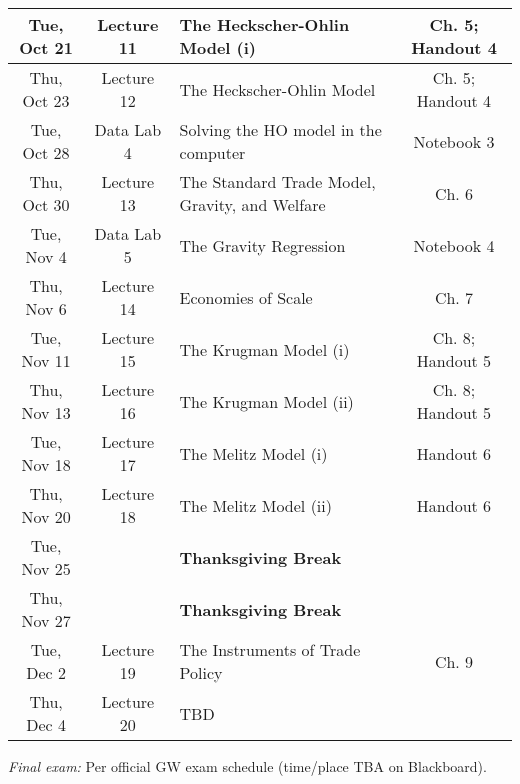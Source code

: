 \documentclass[11pt]{article}
\begin{document}
\begin{center}
\begin{tabular}{|c|c|l|c|}
        Tue,  Oct 21 &Lecture 11 & The Heckscher-Ohlin Model (i)  & Ch. 5; Handout 4  \\ \hline

        Thu, Oct 23 &  Lecture 12 & The Heckscher-Ohlin Model & Ch. 5; Handout 4  \\ \hline 

        Tue, Oct 28 &  Data Lab 4 & Solving the HO model in the computer & Notebook 3 \\ \hline

        Thu, Oct 30 & Lecture 13 & The Standard Trade Model, Gravity, and Welfare   &  Ch. 6   \\ \hline
        
        Tue, Nov 4 & Data Lab 5 & The Gravity Regression & Notebook 4 \\  \hline

        Thu, Nov 6 & Lecture 14 & Economies of Scale & Ch. 7   \\ \hline

        Tue, Nov 11 & Lecture 15 & The Krugman Model (i) & Ch. 8; Handout 5 \\  \hline

        Thu, Nov 13 &Lecture 16 & The Krugman Model (ii)   & Ch. 8; Handout 5   \\ \hline

        Tue, Nov 18 &Lecture 17 & The Melitz Model (i) & Handout 6  \\  \hline

        Thu, Nov 20 & Lecture 18 & The Melitz Model (ii)   &  Handout 6   \\ \hline

        Tue, Nov 25 &  & \textbf{Thanksgiving Break} &   \\  \hline

        Thu, Nov 27 &   & \textbf{Thanksgiving Break}    &    \\ \hline

        Tue, Dec 2 & Lecture 19 & The Instruments of Trade Policy & Ch. 9 \\  \hline

        Thu, Dec 4 &  Lecture 20 & TBD &    \\ \hline
\end{tabular}
\end{center}

\smallskip
\noindent \textit{Final exam:} Per official GW exam schedule (time/place TBA on Blackboard).
\end{document}
